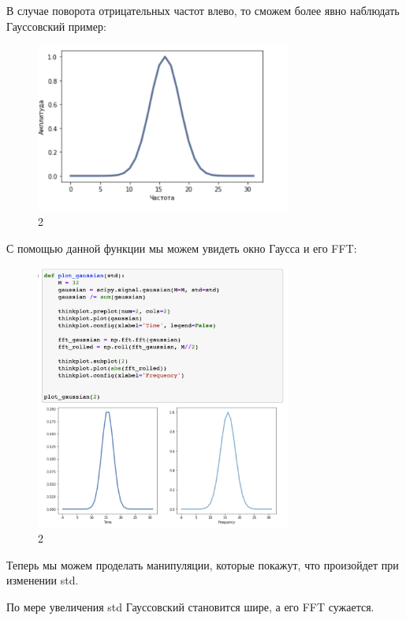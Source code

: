 \documentclass[10pt,a4paper,oneside]{article}
\begin{document}
В случае поворота отрицательных частот влево, то сможем более явно наблюдать Гауссовский пример:

\begin{figure}[H]
        \centering
        \includegraphics[width=0.75\textwidth]{pics/3.png}
        \caption{2}
        \label{fig:first}
\end{figure}

С помощью данной функции мы можем увидеть окно Гаусса и его FFT:

\begin{figure}[H]
        \centering
        \includegraphics[width=0.75\textwidth]{pics/4.png}
        \caption{2}
        \label{fig:first}
\end{figure}

Теперь мы можем проделать манипуляции, которые покажут, что произойдет при изменении std.

По мере увеличения std  Гауссовский становится шире, а его FFT сужается.
\end{document}
